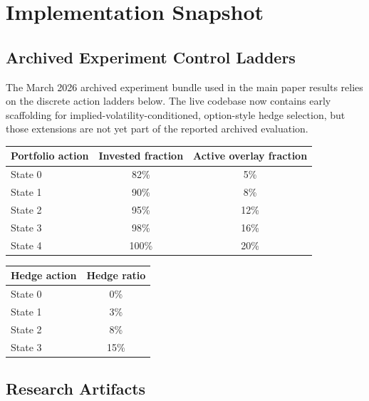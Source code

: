 \documentclass[10pt,twocolumn]{article}
\begin{document}
\appendix

\section{Implementation Snapshot}

\subsection{Archived Experiment Control Ladders}

The March 2026 archived experiment bundle used in the main paper results relies
on the discrete action ladders below. The live codebase now contains early
scaffolding for implied-volatility-conditioned, option-style hedge selection,
but those extensions are not yet part of the reported archived evaluation.

\begin{center}
\begin{tabular}{lcc}
\toprule
Portfolio action & Invested fraction & Active overlay fraction \\
\midrule
State 0 & 82\% & 5\% \\
State 1 & 90\% & 8\% \\
State 2 & 95\% & 12\% \\
State 3 & 98\% & 16\% \\
State 4 & 100\% & 20\% \\
\bottomrule
\end{tabular}
\end{center}

\begin{center}
\begin{tabular}{lc}
\toprule
Hedge action & Hedge ratio \\
\midrule
State 0 & 0\% \\
State 1 & 3\% \\
State 2 & 8\% \\
State 3 & 15\% \\
\bottomrule
\end{tabular}
\end{center}

\subsection{Research Artifacts}
\end{document}
